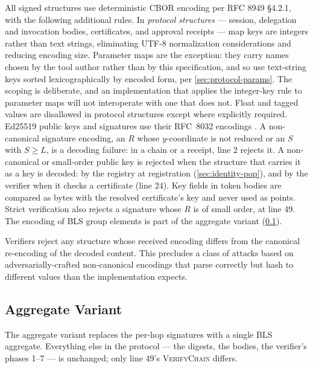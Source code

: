 \documentclass[11pt,a4paper]{article}
\begin{document}
All signed structures use deterministic CBOR encoding per RFC 8949
§4.2.1, with the following additional rules. In \emph{protocol
structures} --- session, delegation and invocation bodies,
certificates, and approval receipts --- map keys are integers rather
than text strings, eliminating UTF-8 normalization considerations and
reducing encoding size. Parameter maps are the exception: they carry
names chosen by the tool author rather than by this specification, and
so use text-string keys sorted lexicographically by encoded form, per
\cref{sec:protocol-params}. The scoping is deliberate, and an
implementation that applies the integer-key rule to parameter maps will
not interoperate with one that does not. Float and tagged values are
disallowed in protocol structures except where explicitly required.
Ed25519 public keys and signatures use their RFC~8032 encodings
\citep{rfc8032}. A non-canonical signature encoding, an $R$ whose
$y$-coordinate is not reduced or an $S$ with $S \geq L$, is a decoding
failure: in a chain or a receipt, line 2 rejects it. A non-canonical or
small-order public key is rejected when the structure that carries it
as a key is decoded: by the registry at registration
(\cref{sec:identity-pop}), and by the verifier when it checks a
certificate (line 24). Key fields in token bodies are compared as bytes
with the resolved certificate's key and never used as points. Strict
verification also rejects a signature whose $R$ is of small order, at
line 49. The encoding of BLS group elements is part of the
aggregate variant (\cref{sec:aggregate-variant}).

Verifiers reject any structure whose received encoding differs from
the canonical re-encoding of the decoded content. This precludes a
class of attacks based on adversarially-crafted non-canonical encodings
that parse correctly but hash to different values than the
implementation expects.

\subsection{Aggregate Variant}
\label{sec:aggregate-variant}

The aggregate variant replaces the per-hop signatures with a single BLS
aggregate. Everything else in the protocol --- the digests, the bodies,
the verifier's phases 1--7 --- is unchanged; only line 49's
\textsc{VerifyChain} differs.
\end{document}
